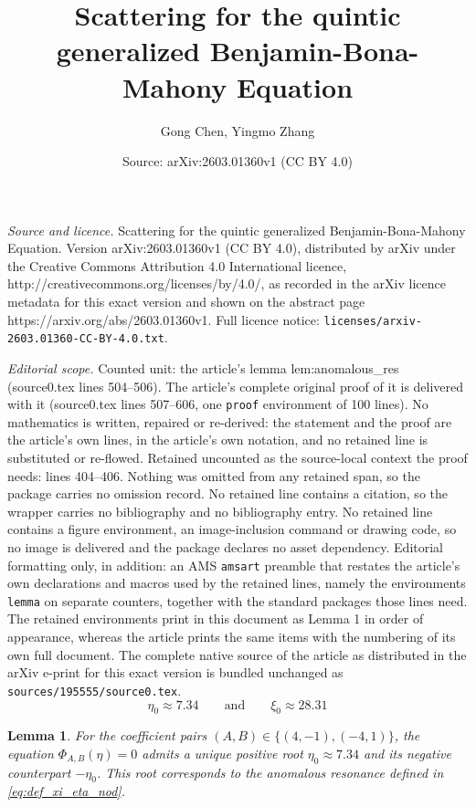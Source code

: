 \documentclass[10pt,a4paper]{amsart}
\title{Scattering for the quintic generalized Benjamin-Bona-Mahony Equation}
\author{Gong Chen, Yingmo Zhang}
\date{Source: arXiv:2603.01360v1 (CC BY 4.0)}
\newtheorem{lemma}{Lemma}
\begin{document}
\maketitle

\noindent\emph{Source and licence.} Scattering for the quintic generalized Benjamin-Bona-Mahony Equation. Version arXiv:2603.01360v1 (CC BY 4.0), distributed by arXiv under the Creative Commons Attribution 4.0 International licence, http://creativecommons.org/licenses/by/4.0/, as recorded in the arXiv licence metadata for this exact version and shown on the abstract page https://arxiv.org/abs/2603.01360v1. Full licence notice: \texttt{licenses/arxiv-2603.01360-CC-BY-4.0.txt}.\par\smallskip

\noindent\textit{Editorial scope.} Counted unit: the article's lemma lem:anomalous\_res (source0.tex lines 504--506). The article's complete original proof of it is delivered with it (source0.tex lines 507--606, one \texttt{proof} environment of 100 lines). No mathematics is written, repaired or re-derived: the statement and the proof are the article's own lines, in the article's own notation, and no retained line is substituted or re-flowed.  Retained uncounted as the source-local context the proof needs: lines 404--406.  Nothing was omitted from any retained span, so the package carries no omission record.  No retained line contains a citation, so the wrapper carries no bibliography and no bibliography entry.  No retained line contains a figure environment, an image-inclusion command or drawing code, so no image is delivered and the package declares no asset dependency.  Editorial formatting only, in addition: an AMS \texttt{amsart} preamble that restates the article's own declarations and macros used by the retained lines, namely the environments \texttt{lemma} on separate counters, together with the standard packages those lines need.  The retained environments print in this document as Lemma 1 in order of appearance, whereas the article prints the same items with the numbering of its own full document.  The complete native source of the article as distributed in the arXiv e-print for this exact version is bundled unchanged as \texttt{sources/195555/source0.tex}.
    \begin{equation}\label{eq:def_xi_eta_nod}
        \eta_0\approx 7.34 \qquad \text{and}\qquad \xi_0\approx 28.31
    \end{equation}

\begin{lemma}\label{lem:anomalous_res}
    For the coefficient pairs $(A,B) \in \{(4,-1), (-4,1)\}$, the equation $\Phi_{A,B}(\eta) = 0$ admits a unique positive root $\eta_0 \approx 7.34$ and its negative counterpart $-\eta_0$. This root corresponds to the anomalous resonance defined in \eqref{eq:def_xi_eta_nod}.
\end{lemma}
\end{document}
